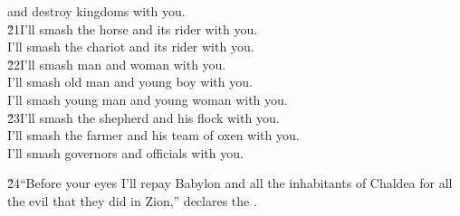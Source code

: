 \begin{poetry}
\poemll    and destroy kingdoms with you. \\
\poeml \v{21}I'll smash the horse and its rider with you. \\
\poemll    I'll smash the chariot and its rider with you. \\
\poeml \v{22}I'll smash man and woman with you. \\
\poemll    I'll smash old man and young boy with you. \\
\poemlll       I'll smash young man and young woman with you. \\
\poeml \v{23}I'll smash the shepherd and his flock with you. \\
\poemll    I'll smash the farmer and his team of oxen with you. \\
\poemlll       I'll smash governors and officials with you.
\end{poetry}

\v{24}``Before your eyes I'll repay Babylon and all the inhabitants of Chaldea for all the evil that they did in Zion,'' declares the .

